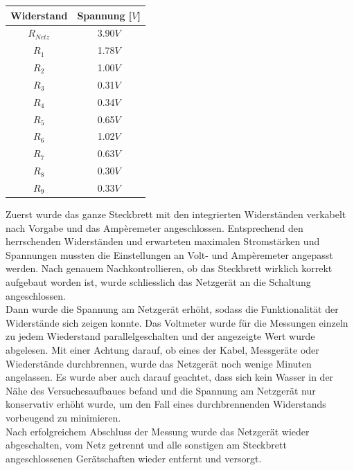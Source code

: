 \documentclass[a4paper,12pt]{article}
\begin{document}
\begin{table}[H]
    \centering
    \begin{tabular}{|c|c|}
        \hline
        \textbf{Widerstand} & \textbf{Spannung [$V$]}\\
        \hline
        $R_{Netz}$ & 3.90$V$\\
        \hline
        $R_1$ & 1.78$V$\\
        \hline
        $R_2$ & 1.00$V$\\
        \hline
        $R_3$ & 0.31$V$\\
        \hline
        $R_4$ & 0.34$V$\\
        \hline
        $R_5$ & 0.65$V$\\
        \hline
        $R_6$ & 1.02$V$\\
        \hline
        $R_7$ & 0.63$V$\\
        \hline
        $R_8$ & 0.30$V$\\
        \hline
        $R_9$ & 0.33$V$\\
        \hline
    \end{tabular}
\end{table}

Zuerst wurde das ganze Steckbrett mit den integrierten Widerständen verkabelt nach Vorgabe und das Ampèremeter angeschlossen. Entsprechend den herrschenden Widerständen und erwarteten maximalen Stromstärken und Spannungen mussten die Einstellungen an Volt- und Ampèremeter angepasst werden. Nach genauem Nachkontrollieren, ob das Steckbrett wirklich korrekt aufgebaut worden ist, wurde schliesslich das Netzgerät an die Schaltung angeschlossen. \\

Dann wurde die Spannung am Netzgerät erhöht, sodass die Funktionalität der Widerstände sich zeigen konnte. Das Voltmeter wurde für die Messungen einzeln zu jedem Wiederstand parallelgeschalten und der angezeigte Wert wurde abgelesen. Mit einer Achtung darauf, ob eines der Kabel, Messgeräte oder Wiederstände durchbrennen, wurde das Netzgerät noch wenige Minuten angelassen. Es wurde aber auch darauf geachtet, dass sich kein Wasser in der Nähe des Versuchesaufbaues befand und die Spannung am Netzgerät nur konservativ erhöht wurde, um den Fall eines durchbrennenden Widerstands vorbeugend zu minimieren.\\

Nach erfolgreichem Abschluss der Messung wurde das Netzgerät wieder abgeschalten, vom Netz getrennt und alle sonstigen am Steckbrett angeschlossenen Gerätschaften wieder entfernt und versorgt.
\end{document}
